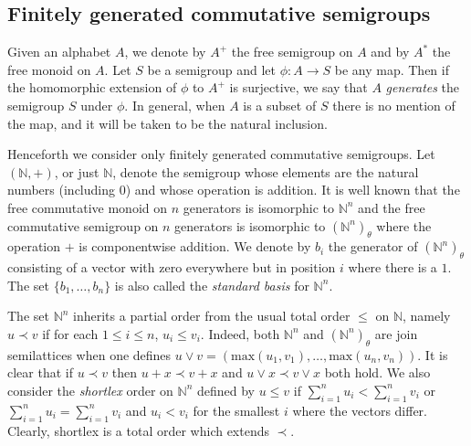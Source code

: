 \documentclass[12pt]{article}
\def\N{{\mathbb{N}}}
\def\max{{\mbox{max}}}
\begin{document}
\subsection{Finitely generated commutative semigroups}

Given an alphabet $A$, we denote by $A^+$ the free semigroup on $A$
and by $A^*$ the free monoid on $A$. Let $S$ be a semigroup and let
$\phi: A \rightarrow S$ be any map. 
Then if the homomorphic extension of
$\phi$ to $A^+$ is surjective, we say that $A$ 
{\em generates} the semigroup $S$ under $\phi$.
In general, when $A$ is a subset of $S$
there is no mention of the map, and it will be 
taken to be the natural inclusion.

Henceforth we consider only finitely generated commutative semigroups.
Let $(\N, +)$, or just $\N$,  denote the  semigroup whose
elements are the natural numbers (including 0) and whose operation is
addition. It is well known that the 
free commutative monoid on  $n$ generators is isomorphic to $\N^n$  
and the free commutative semigroup on $n$ generators is isomorphic to 
$(\N^n)_\theta$ where the operation $+$ is componentwise addition. 
We denote by $b_i$ the generator of $(\N^n)_\theta$ consisting of
a vector with zero everywhere but in position $i$ where there is a 
$1$. The set $\{b_1, \ldots, b_n\}$ is also called the {\em standard basis}
for $\N^n$.

The set $\N^n$ inherits a partial order from the
usual total order $\leq$ on $\mathbb{N}$, namely
$u \prec v$ if for each $1 \leq i \leq n$, $u_i \leq v_i$.
Indeed, both $\N^n$ and $(\N^n)_\theta$ are join semilattices when
one defines $u \vee v = (\max(u_1, v_1), \ldots, \max(u_n,v_n))$.
It is clear that if $u \prec v$ then $u + x \prec v + x$ and
$u \vee x \prec v \vee x$ both hold.
We also consider the {\em shortlex} order on $\mathbb{N}^n$ 
defined by $u \leq v$ if $\sum_{i=1}^n u_i < \sum_{i=1}^n v_i$
or  $\sum_{i=1}^n u_i = \sum_{i=1}^n v_i$ and $u_i < v_i$ for the smallest
$i$ where the vectors differ. Clearly, shortlex is a total order 
which extends $\prec$. 
\end{document}
